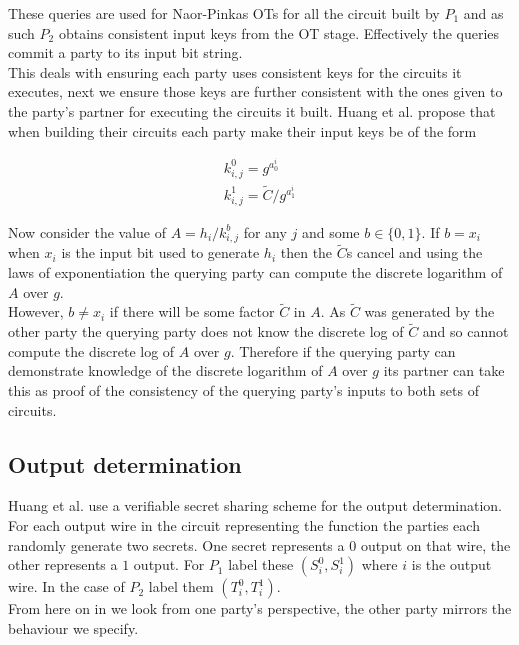 \documentclass[ %
                    author={Nicholas Tutte},
                supervisor={Prof. Nigel Smart},
                    degree={MEng},
                     title={Secure Two Party Computation},
                  subtitle={A practical comparison of recent protocols},
                      type={Research - GG1K},
                      year={2015} ]{dissertation}
\begin{document}
				These queries are used for Naor-Pinkas OTs for all the circuit built by $P_1$ and as such $P_2$ obtains consistent input keys from the OT stage. Effectively the queries commit a party to its input bit string.\\

				This deals with ensuring each party uses consistent keys for the circuits it executes, next we ensure those keys are further consistent with the ones given to the party's partner for executing the circuits it built. Huang et al. propose that when building their circuits each party make their input keys be of the form
				
				$$
				\begin{matrix}
					k_{i,j}^0 = g^{a_0^i}\\
					k_{i,j}^1 = \tilde C / g^{a_1^i}
				\end{matrix}
				$$

				Now consider the value of $A = h_i / k_{i,j}^{b}$ for any $j$ and some $b \in \{0, 1\}$. If $b = x_i$ when $x_i$ is the input bit used to generate $h_i$ then the $\tilde C$s cancel and using the laws of exponentiation the querying party can compute the discrete logarithm of $A$ over $g$.\\

				However, $b \neq x_i$ if there will be some factor $\tilde C$ in $A$. As $\tilde C$ was generated by the other party the querying party does not know the discrete log of $\tilde C$ and so cannot compute the discrete log of $A$ over $g$. Therefore if the querying party can demonstrate knowledge of the discrete logarithm of $A$ over $g$ its partner can take this as proof of the consistency of the querying party's inputs to both sets of circuits.

			\subsection{Output determination}
				Huang et al. use a verifiable secret sharing scheme for the output determination. For each output wire in the circuit representing the function the parties each randomly generate two secrets. One secret represents a $0$ output on that wire, the other represents a $1$ output. For $P_1$ label these $(S_i^0, S_i^1)$ where $i$ is the output wire. In the case of $P_2$ label them $(T_i^0, T_i^1)$.\\

				From here on in we look from one party's perspective, the other party mirrors the behaviour we specify.\\
\end{document}
